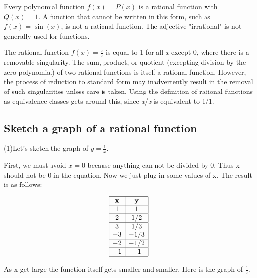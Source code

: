Every polynomial function $f(x) = P(x)$ is a rational function with $Q(x) = 1$. A function
that cannot be written in this form, such as $f(x) = \sin(x)$, is not a rational function.
The adjective "irrational" is not generally used for functions.



The rational function $f(x) = \frac{x}{x}$ is equal to 1 for all \textit{x} except 0,
where there is a removable singularity. The sum, product, or quotient (excepting division
by the zero polynomial) of two rational functions is itself a rational function. However,
the process of reduction to standard form may inadvertently result in the removal of such
singularities unless care is taken. Using the definition of rational functions as
equivalence classes gets around this, since \textit{x}/\textit{x} is equivalent to 1/1.




\subsection{Sketch a graph of a rational function}
\label{sss:sket-9050}




(1)Let's sketch the graph of $y=\frac{1}{x}$.

First, we must avoid $x=0$ because anything can not be divided by 0. Thus x should not be
0 in the equation. Now we just plug in some values of x. The result is as follows:

$$ \begin{array}{|c|c|} \hline \textbf{x} & \textbf{y} \\ \hline 1 & 1 \\ \hline 2 & 1/2 \\ \hline 3 & 1/3 \\ \hline -3 & -1/3 \\ \hline -2 & -1/2 \\ \hline -1 & -1 \\ \hline \end{array} $$ 



As x get large the function itself gets smaller and smaller. Here is the graph of $\frac{1}{x}$.







